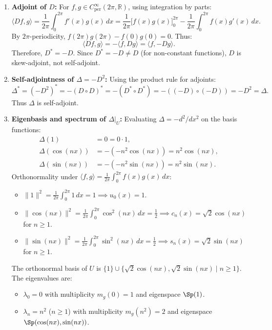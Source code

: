 \begin{exercisesolution}
\label{sol:differential_operators_fourier}
\begin{enumerate}[label=\textbf{(\alph*)}]
    \item \textbf{Adjoint of $D$:}
    For $f, g \in C^\infty_{\text{per}}(2\pi, \mathbb{R})$, using integration by parts:
    \[
    \langle Df, g \rangle = \frac{1}{2\pi} \int_0^{2\pi} f'(x) g(x) \, dx = \frac{1}{2\pi} \big[ f(x) g(x) \big]_0^{2\pi} - \frac{1}{2\pi} \int_0^{2\pi} f(x) g'(x) \, dx.
    \]
    By $2\pi$-periodicity, $f(2\pi)g(2\pi) - f(0)g(0) = 0$. Thus:
    \[
    \langle Df, g \rangle = -\langle f, Dg \rangle = \langle f, -Dg \rangle.
    \]
    Therefore, $D^* = -D$. Since $D^* = -D \ne D$ (for non-constant functions), $D$ is skew-adjoint, not self-adjoint.

    \item \textbf{Self-adjointness of $\Delta = -D^2$:}
    Using the product rule for adjoints:
    \[
    \Delta^* = (-D^2)^* = -(D \circ D)^* = -(D^* \circ D^*) = -((-D) \circ (-D)) = -D^2 = \Delta.
    \]
    Thus $\Delta$ is self-adjoint.

    \item \textbf{Eigenbasis and spectrum of $\Delta|_U$:}
    Evaluating $\Delta = -d^2/dx^2$ on the basis functions:
    \begin{align*}
    \Delta(1) &= 0 = 0 \cdot 1, \\
    \Delta(\cos(nx)) &= -(-n^2 \cos(nx)) = n^2 \cos(nx), \\
    \Delta(\sin(nx)) &= -(-n^2 \sin(nx)) = n^2 \sin(nx).
    \end{align*}
    Orthonormality under $\langle f, g \rangle = \frac{1}{2\pi}\int_0^{2\pi} f(x)g(x)\,dx$:
    \begin{itemize}
        \item $\|1\|^2 = \frac{1}{2\pi} \int_0^{2\pi} 1\,dx = 1 \implies u_0(x) = 1$.
        \item $\|\cos(nx)\|^2 = \frac{1}{2\pi} \int_0^{2\pi} \cos^2(nx)\,dx = \frac{1}{2} \implies c_n(x) = \sqrt{2}\cos(nx)$ for $n \ge 1$.
        \item $\|\sin(nx)\|^2 = \frac{1}{2\pi} \int_0^{2\pi} \sin^2(nx)\,dx = \frac{1}{2} \implies s_n(x) = \sqrt{2}\sin(nx)$ for $n \ge 1$.
    \end{itemize}
    The orthonormal basis of $U$ is $\{1\} \cup \{\sqrt{2}\cos(nx), \sqrt{2}\sin(nx) \mid n \ge 1\}$.
    The eigenvalues are:
    \begin{itemize}
        \item $\lambda_0 = 0$ with multiplicity $m_g(0) = 1$ and eigenspace $\Sp(1)$.
        \item $\lambda_n = n^2$ ($n \ge 1$) with multiplicity $m_g(n^2) = 2$ and eigenspace $\Sp(\cos(nx), \sin(nx))$. \qedhere
    \end{itemize}
\end{enumerate}
\end{exercisesolution}

